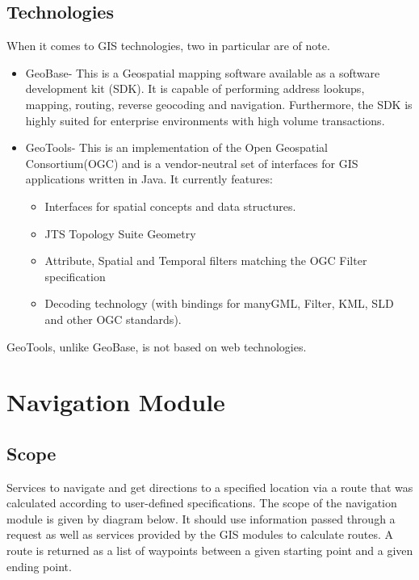 \documentclass[12pt]{article}
\begin{document}
\subsection{Technologies}
When it comes to GIS technologies, two in particular are of note. 
\begin{itemize}
\item GeoBase- This is a Geospatial mapping software available as a software development kit (SDK). It is capable of performing address lookups, mapping, routing, reverse geocoding and navigation. Furthermore, the SDK is highly suited for enterprise environments with high volume transactions.
\item GeoTools- This is an implementation of the Open Geospatial Consortium(OGC) and is a vendor-neutral set of interfaces for GIS applications written in Java. It currently features:
\begin{itemize}
\item Interfaces for spatial concepts and data structures.
\item JTS Topology Suite Geometry
\item Attribute, Spatial and Temporal filters matching the OGC Filter specification
\item Decoding technology (with bindings for manyGML, Filter, KML, SLD and other OGC standards).
\end{itemize}
\end{itemize}
GeoTools, unlike GeoBase, is not based on web technologies.

\section{Navigation Module}
\subsection{Scope}
Services to navigate and get directions to a specified location via a route that was calculated according to user-defined specifications. The scope of the navigation module is given by diagram below. It should use information passed through a request as well as services provided by the GIS modules to calculate routes. A route is returned  as a list of waypoints between a given starting point and a given ending point.
\end{document}
